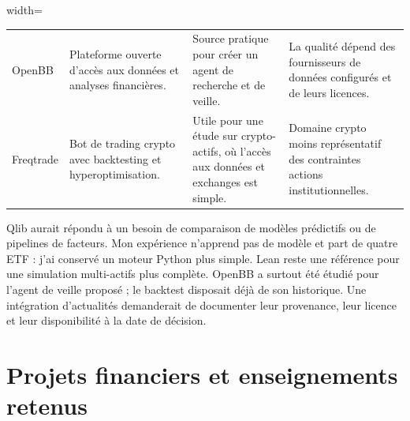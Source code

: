 \begin{table}[H]
\begin{adjustbox}{width=\textwidth}
\begin{tabular}{p{}p{}p{}p{}}
OpenBB \citep{githubOpenBB} & Plateforme ouverte d'accès aux données et analyses financières. & Source pratique pour créer un agent de recherche et de veille. & La qualité dépend des fournisseurs de données configurés et de leurs licences. \\
Freqtrade \citep{githubFreqtrade} & Bot de trading crypto avec backtesting et hyperoptimisation. & Utile pour une étude sur crypto-actifs, où l'accès aux données et exchanges est simple. & Domaine crypto moins représentatif des contraintes actions institutionnelles. \\
\bottomrule
\end{tabular}
\end{adjustbox}
\end{table}

Qlib aurait répondu à un besoin de comparaison de modèles prédictifs ou de pipelines de facteurs. Mon expérience n'apprend pas de modèle et part de quatre ETF : j'ai conservé un moteur Python plus simple. Lean reste une référence pour une simulation multi-actifs plus complète. OpenBB a surtout été étudié pour l'agent de veille proposé ; le backtest disposait déjà de son historique. Une intégration d'actualités demanderait de documenter leur provenance, leur licence et leur disponibilité à la date de décision.

\section{Projets financiers et enseignements retenus}

